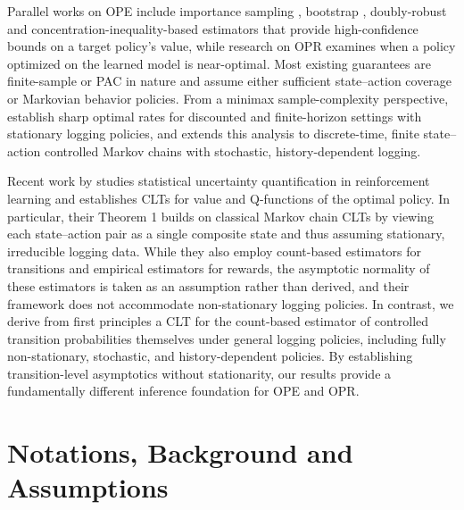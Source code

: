 \documentclass[twoside,11pt]{article}
\numberwithin{equation}{section}
\begin{document}
Parallel works on OPE include importance sampling \citep{precup2000eligibility}, bootstrap \citep{hanna2017bootstrapping, hao2021bootstrapping}, doubly-robust \citep{pmlr-v48-jiang16, thomas2016data} and concentration-inequality-based \citep{thomas2015high} estimators that provide high-confidence bounds on a target policy’s value, while research on OPR \citep{antos2008learning, munos2008finite, chen2019information, zanette2021exponential, shi2022pessimistic} examines when a policy optimized on the learned model is near-optimal. 
Most existing guarantees are finite-sample or PAC in nature and assume either sufficient state–action coverage or Markovian behavior policies.
From a minimax sample-complexity perspective, \cite{li2022settling, yan2022model} establish sharp optimal rates for discounted and finite-horizon settings with stationary logging policies, and \cite{banerjee2025off} extends this analysis to discrete-time, finite state–action controlled Markov chains with stochastic, history-dependent logging.

Recent work by \cite{zhu2024uncertainty} studies statistical uncertainty quantification in reinforcement learning and establishes CLTs for value and Q-functions of the optimal policy.
In particular, their Theorem 1 builds on classical Markov chain CLTs \citep{trevezas2009variance} by viewing each state–action pair as a single composite state and thus assuming stationary, irreducible logging data.
While they also employ count-based estimators for transitions and empirical estimators for rewards, the asymptotic normality of these estimators is taken as an assumption rather than derived, and their framework does not accommodate non-stationary logging policies.
In contrast, we derive from first principles a CLT for the count-based estimator of controlled transition probabilities themselves under general logging policies, including fully non-stationary, stochastic, and history-dependent policies. 
By establishing transition-level asymptotics without stationarity, our results provide a fundamentally different inference foundation for OPE and OPR. 

\section{Notations, Background and Assumptions}
\label{sec:notation}
\end{document}
